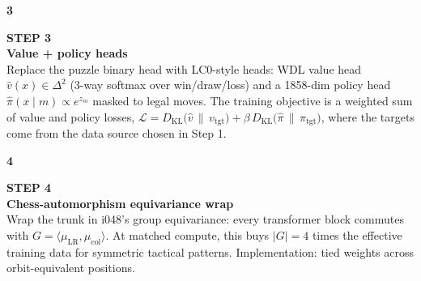 \documentclass[10pt,a4paper]{article}
\begin{document}
\vspace{2pt}{\color{linecolor}\rule{\linewidth}{0.3pt}}\vspace{2pt}\par
\begin{minipage}{\linewidth}
\begin{minipage}[t]{0.06\linewidth}
\selectfont\LARGE\bfseries\color{forest}3
\end{minipage}\hfill
\begin{minipage}[t]{0.93\linewidth}
\textcolor{muted}{\scriptsize\sffamily\bfseries STEP 3}\\[0pt]
\textcolor{deepforest}{\sffamily\normalsize\bfseries Value + policy heads}\\[2pt]
Replace the puzzle binary head with LC0-style heads: WDL value head $\hat{v}(x) \in \Delta^2$ (3-way softmax over win/draw/loss) and a 1858-dim policy head $\hat{\pi}(x \mid m) \propto e^{z_m}$ masked to legal moves. The training objective is a weighted sum of value and policy losses, $\mathcal{L} = D_{\mathrm{KL}}\!\bigl(\hat{v} \,\|\, v_{\mathrm{tgt}}\bigr) + \beta\,D_{\mathrm{KL}}\!\bigl(\hat{\pi} \,\|\, \pi_{\mathrm{tgt}}\bigr)$, where the targets come from the data source chosen in Step 1.
\end{minipage}
\end{minipage}\par
\vspace{2pt}{\color{linecolor}\rule{\linewidth}{0.3pt}}\vspace{2pt}\par
\begin{minipage}{\linewidth}
\begin{minipage}[t]{0.06\linewidth}
\selectfont\LARGE\bfseries\color{forest}4
\end{minipage}\hfill
\begin{minipage}[t]{0.93\linewidth}
\textcolor{muted}{\scriptsize\sffamily\bfseries STEP 4}\\[0pt]
\textcolor{deepforest}{\sffamily\normalsize\bfseries Chess-automorphism equivariance wrap}\\[2pt]
Wrap the trunk in i048's group equivariance: every transformer block commutes with $G = \langle\mu_{\mathrm{LR}}, \mu_{\mathrm{col}}\rangle$. At matched compute, this buys $|G| = 4$ times the effective training data for symmetric tactical patterns. Implementation: tied weights across orbit-equivalent positions.
\end{minipage}
\end{minipage}\par
\end{document}
